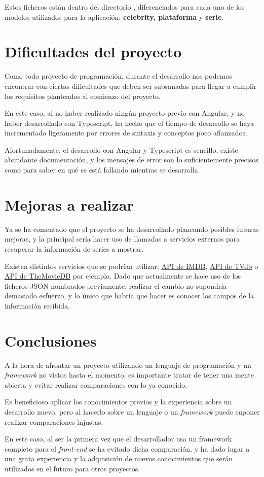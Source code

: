 \documentclass{\ClassPath/viu-tfm-template}
\begin{document}
Estos ficheros están dentro del directorio , diferenciados para cada uno de los modelos utilizados para la aplicación: \textbf{celebrity, plataforma} y \textbf{serie}.


\chapter{Dificultades del proyecto}

Como todo proyecto de programación, durante el desarrollo nos podemos encontrar con ciertas dificultades que deben ser subsanadas para llegar a cumplir los requisitos planteados al comienzo del proyecto.

En este caso, al no haber realizado ningún proyecto previo con Angular, y no haber desarrollado con Typescript, ha hecho que el tiempo de desarrollo se haya incrementado ligeramente por errores de sintaxis y conceptos poco afianzados.

Afortunadamente, el desarrollo con Angular y Typescript es sencillo, existe abundante documentación, y los mensajes de error son lo suficientemente precisos como para saber en qué se está fallando mientras se desarrolla.



\chapter{Mejoras a realizar}

Ya se ha comentado que el proyecto se ha desarrollado planeando posibles futuras mejoras, y la principal sería hacer uso de llamadas a servicios externos para recuperar la información de series a mostrar.

Existen distintos servicios que se podrían utilizar:  \href{https://imdb-api.com/API}{API de IMDB}, \href{https://thetvdb.com/api-information}{API de TVdb} o \href{https://www.themoviedb.org/documentation/api}{API de TheMovieDB} por ejemplo. Dado que actualmente se hace uso de los ficheros JSON nombrados previamente, realizar el cambio no supondría demasiado esfuerzo, y lo único que habría que hacer es conocer los campos de la información recibida.


\chapter{Conclusiones}

A la hora de afrontar un proyecto utilizando un lenguaje de programación y un \textit{framework} no vistos hasta el momento, es importante tratar de tener una mente abierta y evitar realizar comparaciones con lo ya conocido.

Es beneficioso aplicar los conocimientos previos y la experiencia sobre un desarrollo nuevo, pero al hacerlo sobre un lenguaje o un \textit{framework} puede suponer realizar comparaciones injustas.

En este caso, al ser la primera vez que el desarrollador usa un framework completo para el \textit{front-end} se ha evitado dicha comparación, y ha dado lugar a una grata experiencia y la adquisición de nuevos conocimientos que serán utilizados en el futuro para otros proyectos.
\end{document}
